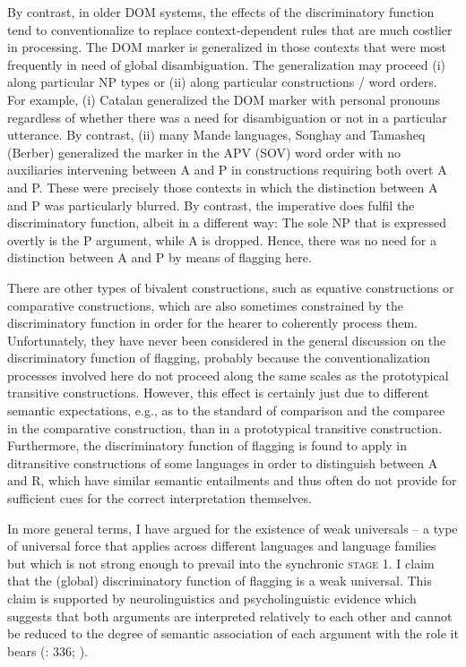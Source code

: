 \documentclass[output=paper]{langsci/langscibook}
\begin{document}
By contrast, in older DOM systems, the effects of the discriminatory function tend to conventionalize to replace context-dependent rules that are much costlier in processing. The DOM marker is generalized in those contexts that were most frequently in need of global disambiguation. The generalization may proceed (i) along particular NP types or (ii) along particular constructions / word orders. For example, (i) Catalan generalized the DOM marker with personal pronouns regardless of whether there was a need for disambiguation or not in a particular utterance. By contrast, (ii) many Mande languages, Songhay and Tamasheq (Berber) generalized the marker in the APV (SOV) word order with no auxiliaries intervening between A and P in constructions requiring both overt A and P. These were precisely those contexts in which the distinction between A and P was particularly blurred. By contrast, the imperative does fulfil the discriminatory function, albeit in a different way: The sole NP that is expressed overtly is the P argument, while A is dropped. Hence, there was no need for a distinction between A and P by means of flagging here.

There are other types of bivalent constructions, such as equative constructions or comparative constructions, which are also sometimes constrained by the discriminatory function in order for the hearer to coherently process them. Unfortunately, they have never been considered in the general discussion on the discriminatory function of flagging, probably because the conventionalization processes involved here do not proceed along the same scales as the prototypical transitive constructions. However, this effect is certainly just due to different semantic expectations, e.g., as to the standard of comparison and the comparee in the comparative construction, than in a prototypical transitive construction. Furthermore, the discriminatory function of flagging is found to apply in ditransitive constructions of some languages in order to distinguish between A and R, which have similar semantic entailments and thus often do not provide for sufficient cues for the correct interpretation themselves. 

In more general terms, I have argued for the existence of weak universals – a type of universal force that applies across different languages and language families but which is not strong enough to prevail into the synchronic \textsc{stage} 1. I claim that the (global) discriminatory function of flagging is a weak universal. This claim is supported by neurolinguistics and psycholinguistic evidence which suggests that both arguments are interpreted relatively to each other and cannot be reduced to the degree of semantic association of each argument with the role it bears (\citealt{Bornkessel-SchlesewskySchlesewsky2015}: 336; \citealt{AhnCho2007,FedzechkinaEtAl2012,KurumadaJaeger2015}).
\end{document}
